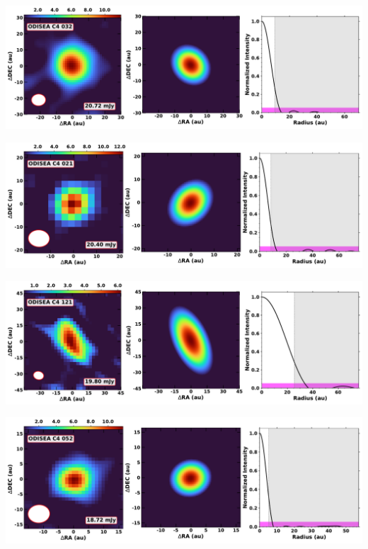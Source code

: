 \vspace{0pt}
\begin{minipage}{.49\textwidth}
	 \centering
	 	 \hrulesep
	 	 \includegraphics[width=1\linewidth]{pdf/0+II/025_odisea_c4_032_cutout.pdf}
\end{minipage}%
\vrulesep
\begin{minipage}{.49\textwidth}
	 \centering
	 	 \hrulesep
	 	 \includegraphics[width=1\linewidth]{pdf/0+II/024_odisea_c4_021_cutout.pdf}
\end{minipage}%
\vspace{0pt}
\begin{minipage}{.49\textwidth}
	 \centering
	 	 \hrulesep
	 	 \includegraphics[width=1\linewidth]{pdf/0+II/023_odisea_c4_121_cutout.pdf}
\end{minipage}%
\vrulesep
\begin{minipage}{.49\textwidth}
	 \centering
	 	 \hrulesep
	 	 \includegraphics[width=1\linewidth]{pdf/0+II/022_odisea_c4_052_cutout.pdf}
\end{minipage}%
